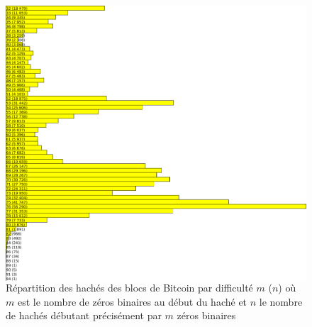 \documentclass{beamer}
\begin{document}
\begin{frame}
\begin{figure}
      \begin{columns}
        \includegraphics[width=\textwidth]{illustrations/binHashesStats.png}
        \caption{Répartition des hachés des blocs de Bitcoin par difficulté $m$ ($n$) où $m$ est le nombre de zéros binaires au début du haché et $n$ le nombre de hachés débutant précisément par $m$ zéros binaires}
        \label{fig:example right}
      \end{columns}
    \end{figure}


\end{frame}
\end{document}
